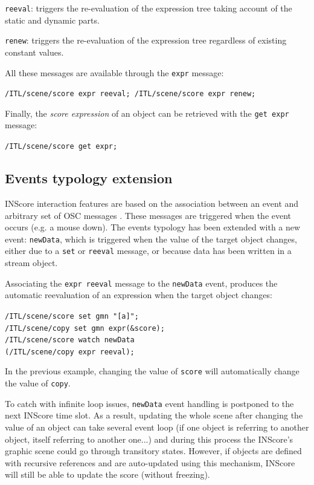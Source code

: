 \documentclass{article}
\newcommand{\OSC}[1]{\texttt{#1}}
\let\olditemize\itemize
\let\oldenditemize\enditemize
\renewenvironment{itemize} 	{\olditemize \setlength{\itemsep}{1mm}}{\oldenditemize}
\newcommand{\sample}	[1]			{\vspace{-0.2em}\begin{center}\colorbox{mygrey}{\begin{minipage}[t]{0.95\columnwidth} {\small \texttt{#1}}\end{minipage}}\end{center}}
\begin{document}
\begin{itemize}
\item \OSC{reeval}: triggers the re-evaluation of the expression tree taking account of the static and dynamic parts.
\item \OSC{renew}: triggers the re-evaluation of the expression tree regardless of existing constant values. 
\end{itemize}

All these messages are available through the \OSC{expr} message:
\sample{/ITL/scene/score expr reeval;
/ITL/scene/score expr renew;
}

Finally, the  \emph{score expression} of an object can be retrieved with the \OSC{get expr} message:
\sample{/ITL/scene/score get expr;}

\subsection{Events typology extension}
\label{exprEvents}

INScore interaction features are based on the association between an event and arbitrary set of OSC messages \cite{Fober:13b}. These messages are triggered when the event occurs (e.g. a mouse down).
The events typology has been extended with a new event: \OSC{newData}, which is triggered when the value of the target object changes, either due to a \OSC{set} or \OSC{reeval} message, or because data has been written in a stream object.

Associating the \OSC{expr reeval} message to the \OSC{newData} event, produces the automatic reevaluation of an expression when the target object changes:
\sample{/ITL/scene/score set gmn "[a]";\\
/ITL/scene/copy set gmn expr(\&score);\\
/ITL/scene/score watch newData\\   
\hspace*{8mm}(/ITL/scene/copy expr reeval);
}
In the previous example, changing the value of \OSC{score} will automatically change the value of \OSC{copy}.

To catch with infinite loop issues, \OSC{newData} event handling is postponed to the next INScore time slot. As a result, updating the whole scene after changing the value of an object can take several event loop (if one object is referring to another object, itself referring to another one...) and during this process the INScore's graphic scene could go through transitory states. However, if objects are defined with recursive references and are auto-updated using this mechanism, INScore will still be able to update the score (without freezing).
\end{document}
